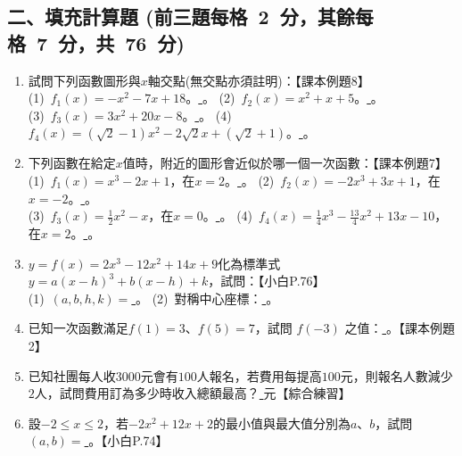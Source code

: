\documentclass[b4paper,12pt]{exam}
\newif\ifshowAnswer
\newcommand{\colorAnswer}[2]{%
{
  \makebox[6em][c]{%
    \ifshowAnswer
      {\color{#1}#2}%
    \else
      \phantom{#2}%
    \fi
  }}%
}
\begin{document}
\subsection*{二、填充計算題 (前三題每格\ 2\ 分，其餘每格\ 7\ 分，共\ 76\ 分)}
\begin{enumerate}[itemsep=1em, topsep=1em]
    \item 試問下列函數圖形與$x$軸交點(無交點亦須註明)：【課本例題8】\\[0.5em]
        (1)~$f_1(x)=-x^2-7x+18$。\underline{\colorAnswer{red}{$?$}}。\hspace{2em}
        (2)~$f_2(x)=x^2+x+5$。\underline{\colorAnswer{red}{$?$}}。\\[.5em]
        (3)~$f_3(x)=3x^2+20x-8$。\underline{\colorAnswer{red}{$?$}}。\hspace{2.5em}
        (4)~$f_4(x)=(\sqrt{2}-1)x^2-2\sqrt{2}x+(\sqrt{2}+1)$。\underline{\colorAnswer{red}{$?$}}。

    \item 下列函數在給定$x$值時，附近的圖形會近似於哪一個一次函數：【課本例題7】\\[0.5em]
        (1)~$f_1(x)=x^3-2x+1$，在$x=2$。\underline{\colorAnswer{red}{$?$}}。\hspace{1em}
        (2)~$f_2(x)=-2x^3+3x+1$，在$x=-2$。\underline{\colorAnswer{red}{$?$}}。\\[.5em]
        (3)~$f_3(x)=\frac{1}{2}x^2-x$，在$x=0$。\underline{\colorAnswer{red}{$?$}}。\hspace{0.5em}
        (4)~$f_4(x)=\frac14x^3-\frac{13}4x^2+13x-10$，在$x=2$。\underline{\colorAnswer{red}{$?$}}。

    \item $y=f(x)=2x^3-12x^2+14x+9$化為標準式$y=a(x-h)^3+b(x-h)+k$，試問：【小白P.76】\\[0.5em]
        (1)~$(a,b,h,k)=$\underline{\colorAnswer{red}{$?$}}。\hspace{5em}
        (2)~對稱中心座標：\underline{\colorAnswer{red}{$?$}}。

    \item 已知一次函數滿足$f(1)=3$、$f(5)=7$，試問 $f(-3)$ 之值：\underline{\colorAnswer{red}{$?$}}。【課本例題2】

    \item 已知社團每人收$3000$元會有$100$人報名，若費用每提高$100$元，則報名人數減少$2$人，試問費用訂為多少時收入總額最高？\underline{\colorAnswer{red}{$?$}}元【綜合練習】

    \item 設$-2\leq x\leq2$，若$-2x^2+12x+2$的最小值與最大值分別為$a$、$b$，試問$(a,b)=$\underline{\colorAnswer{red}{$?$}}。【小白P.74】
    

\end{enumerate}
\end{document}
